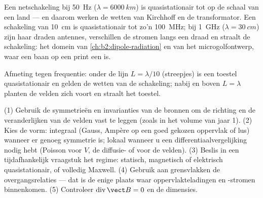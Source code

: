\begin{example}\label{ex:b2:maxwell-equations:sizes}
Een netschakeling bij \qty{50}{Hz} ($\lambda = \qty{6000}{km}$) is
quasistationair tot op de schaal van een land --- en daarom werken de wetten
van Kirchhoff en de transformator. Een schakeling van \qty{10}{cm} is
quasistationair tot zo'n \qty{100}{MHz}; bij \qty{1}{GHz}
($\lambda = \qty{30}{cm}$) zijn haar draden antennes, verschillen de stromen
langs een draad en straalt de schakeling: het domein van
\cref{ch:b2:dipole-radiation} en van het microgolfontwerp, waar een baan op
een print een  is.
\end{example}

\begin{omfigure}

{\small Afmeting tegen frequentie: onder de lijn $L = \lambda/10$
(streepjes) is een toestel quasistationair en gelden de wetten van de
schakeling; nabij en boven $L = \lambda$ planten de velden zich voort en
straalt het toestel.}
\end{omfigure}

\begin{method}\label{met:b2:maxwell-equations:method}
(1) Gebruik de symmetrieën en invarianties van de bronnen om de richting en
de veranderlijken van de velden vast te leggen (zoals in het volume van jaar
1). (2) Kies de vorm: integraal (Gauss, Ampère op een goed gekozen oppervlak
of lus) wanneer er genoeg symmetrie is; lokaal wanneer u een
differentiaalvergelijking nodig hebt (Poisson voor $V$, de diffusie- of
 voor de velden). (3) Beslis in een tijdafhankelijk
vraagstuk het regime: statisch, magnetisch of elektrisch quasistationair, of
volledig Maxwell. (4) Gebruik aan grensvlakken de overgangsrelaties --- dat
is de enige plaats waar oppervlakteladingen en -stromen binnenkomen. (5)
Controleer $\operatorname{div}\vect B = 0$ en de dimensies.
\end{method}

